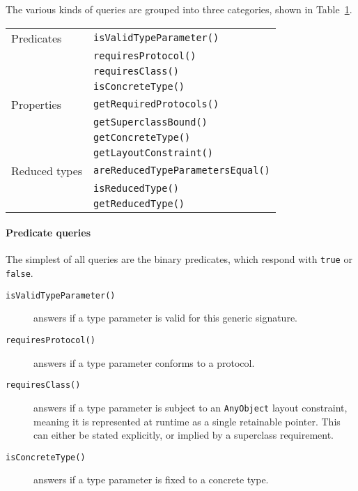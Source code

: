 \documentclass[a4paper,headsepline,bibliography=totoc,toc=flat,fleqn,twoside=semi]{scrbook}
\theoremstyle{definition}
\theoremstyle{definition}
\theoremstyle{definition}
\begin{document}
The various kinds of queries are grouped into three categories, shown in Table~\ref{genericsigquerytable}.
\begin{table}\label{genericsigquerytable}
\begin{center}
\begin{tabular}{|l|l|}
\hline
Predicates&\texttt{isValidTypeParameter()}\\
&\texttt{requiresProtocol()}\\
&\texttt{requiresClass()}\\
&\texttt{isConcreteType()}\\
\hline
Properties&\texttt{getRequiredProtocols()}\\
&\texttt{getSuperclassBound()}\\
&\texttt{getConcreteType()}\\
&\texttt{getLayoutConstraint()}\\
\hline
Reduced types&\texttt{areReducedTypeParametersEqual()}\\
&\texttt{isReducedType()}\\
&\texttt{getReducedType()}\\
\hline
\end{tabular}
\end{center}
\end{table}

\paragraph{Predicate queries}
The simplest of all queries are the binary predicates, which respond with \texttt{true} or \texttt{false}.
\begin{description}
\item [\texttt{isValidTypeParameter()}] answers if a type parameter is valid for this generic signature.

\item [\texttt{requiresProtocol()}] answers if a type parameter conforms to a protocol.

\item [\texttt{requiresClass()}] answers if a type parameter is subject to an \texttt{AnyObject} layout constraint, meaning it is represented at runtime as a single retainable pointer. This can either be stated explicitly, or implied by a superclass requirement.

\item [\texttt{isConcreteType()}] answers if a type parameter is fixed to a concrete type. 
\end{description}
\end{document}
